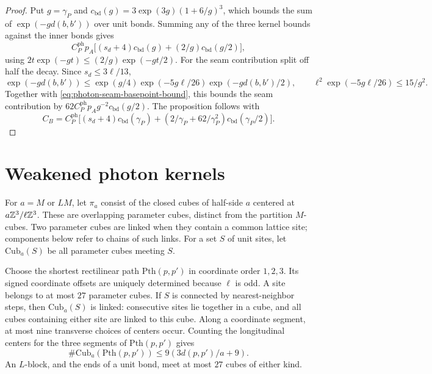 \begin{proof}
Put $g=\gamma_P$ and
$c_{\mathrm{bd}}(g)=3\exp(3g)(1+6/g)^3$, which bounds the sum
of $\exp(-g d(b,b'))$ over unit bonds. Summing any of the three
kernel bounds against the inner bonds gives
\[
 C_P^{\mathrm{ph}}p_A\big[(s_d+4)c_{\mathrm{bd}}(g)
                         +(2/g)c_{\mathrm{bd}}(g/2)\big],
\]
using $2t\exp(-gt)\le(2/g)\exp(-gt/2)$.
For the seam contribution split off half the decay. Since
$s_d\le3\ell/13$,
\[
 \exp(-g d(b,b'))
 \le\exp(g/4)\exp(-5g\ell/26)\exp(-g d(b,b')/2),
 \qquad
 \ell^2\exp(-5g\ell/26)\le15/g^2.
\]
Together with \eqref{eq:photon-seam-basepoint-bound}, this bounds
the seam contribution by
$62C_P^{\mathrm{ph}}p_Ag^{-2}c_{\mathrm{bd}}(g/2)$.
The proposition follows with
\begin{equation}\label{eq:photon-local-regularity-constant}
 C_B=C_P^{\mathrm{ph}}\big[(s_d+4)c_{\mathrm{bd}}(\gamma_P)
 +(2/\gamma_P+62/\gamma_P^2)c_{\mathrm{bd}}(\gamma_P/2)\big].
\end{equation}
\end{proof}

\section{Weakened photon kernels}
\label{subsec:photon-weakened-kernels}

For $a=M$ or $LM$, let $\pi_a$ consist of the closed cubes of
half-side $a$ centered at $a\mathbb Z^3/\ell\mathbb Z^3$. These are overlapping
parameter cubes, distinct from the partition $M$-cubes.
Two parameter cubes are linked when they contain a common lattice
site; components below refer to chains of such links. For a set
$S$ of unit sites, let $\mathrm{Cub}_a(S)$ be all parameter cubes
meeting $S$.

Choose the shortest rectilinear path $\mathrm{Pth}(p,p')$ in
coordinate order $1,2,3$. Its signed coordinate offsets are
uniquely determined because $\ell$ is odd. A site belongs to at
most $27$ parameter cubes. If $S$ is connected by nearest-neighbor
steps, then $\mathrm{Cub}_a(S)$ is linked: consecutive sites lie
together in a cube, and all cubes containing either site are
linked to this cube. Along a coordinate segment, at most nine
transverse choices of centers occur. Counting the longitudinal
centers for the three segments of $\mathrm{Pth}(p,p')$ gives
\begin{equation}\label{eq:photon-parameter-path-count}
 \#\mathrm{Cub}_a(\mathrm{Pth}(p,p'))
                            \le9(3d(p,p')/a+9).
\end{equation}
An $L$-block, and the ends of a unit bond, meet at most $27$
cubes of either kind.


